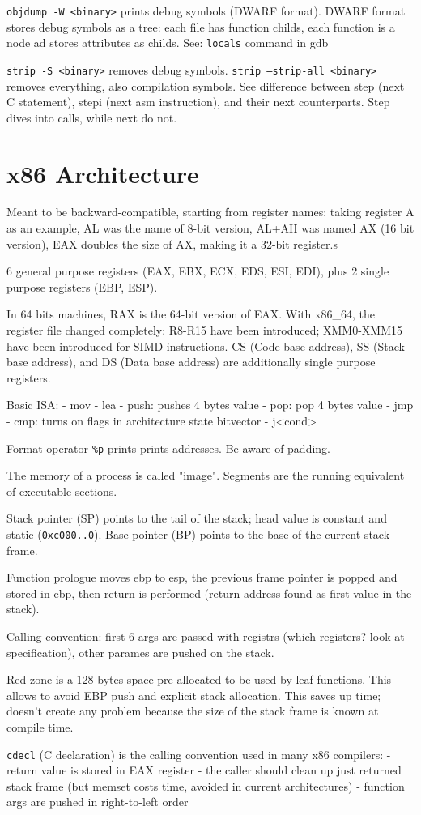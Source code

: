 \texttt{objdump -W <binary>} prints debug symbols (DWARF format).
DWARF format stores debug symbols as a tree: each file has function childs, each function is a node ad stores attributes as childs.
See: \texttt{locals} command in gdb

\texttt{strip -S <binary>} removes debug symbols. \texttt{strip --strip-all <binary>} removes everything, also compilation symbols.
See difference between step (next C statement), stepi (next asm instruction), and their next counterparts. Step dives into calls, while next do not.

\section{x86 Architecture}
Meant to be backward-compatible, starting from register names: taking register A as an example, AL was the name of 8-bit version, AL+AH was named AX (16 bit version), EAX doubles the size of AX, making it a 32-bit register.s

6 general purpose registers (EAX, EBX, ECX, EDS, ESI, EDI), plus 2 single purpose registers (EBP, ESP).

In 64 bits machines, RAX is the 64-bit version of EAX. With x86_64, the register file changed completely: R8-R15 have been introduced; XMM0-XMM15 have been introduced for SIMD instructions.
CS (Code base address), SS (Stack base address), and DS (Data base address) are additionally single purpose registers.

Basic ISA:
- mov
- lea
- push: pushes 4 bytes value
- pop: pop 4 bytes value
- jmp
- cmp: turns on flags in architecture state bitvector
- j<cond>

Format operator \texttt{\%p} prints prints addresses. Be aware of padding.

The memory of a process is called "image". Segments are the running equivalent of executable sections.

Stack pointer (SP) points to the tail of the stack; head value is constant and static (\texttt{0xc000..0}).
Base pointer (BP) points to the base of the current stack frame.

Function prologue moves ebp to esp, the previous frame pointer is popped and stored in ebp, then return is performed (return address found as first value in the stack).

Calling convention: first 6 args are passed with registrs (which registers? look at specification), other parames are pushed on the stack.

Red zone is a 128 bytes space pre-allocated to be used by leaf functions. This allows to avoid EBP push and explicit stack allocation.
This saves up time; doesn't create any problem because the size of the stack frame is known at compile time.

\texttt{cdecl} (C declaration) is the calling convention used in many x86 compilers:
- return value is stored in EAX register
- the caller should clean up just returned stack frame (but memset costs time, avoided in current architectures)
- function args are pushed in right-to-left order